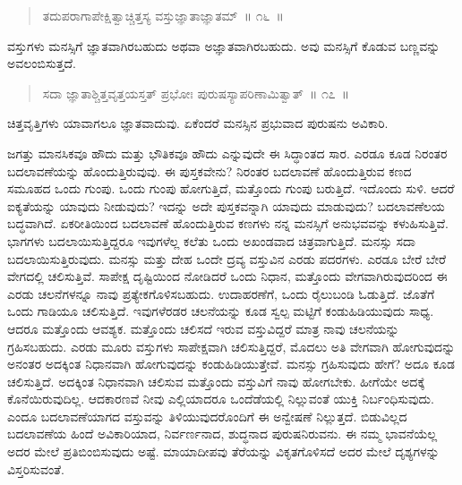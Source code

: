 \vspace{-0.3cm}

\begin{verse}
ತದುಪರಾಗಾಪೇಕ್ಷಿತ್ವಾಚ್ಚಿತ್ತಸ್ಯ ವಸ್ತುಜ್ಞಾತಾಜ್ಞಾತಮ್​~॥ ೧೬~॥
\end{verse}

\vspace{-0.3cm}

ವಸ್ತುಗಳು ಮನಸ್ಸಿಗೆ ಜ್ಞಾತವಾಗಿರಬಹುದು ಅಥವಾ ಅಜ್ಞಾತವಾಗಿರಬಹುದು. ಅವು ಮನಸ್ಸಿಗೆ ಕೊಡುವ ಬಣ್ಣವನ್ನು ಅವಲಂಬಿಸುತ್ತದೆ. 

\vspace{-0.3cm}

\begin{verse}
ಸದಾ ಜ್ಞಾತಾಶ್ಚಿತ್ತವೃತ್ತಯಸ್ತತ್​ ಪ್ರಭೋಃ ಪುರುಷಸ್ಯಾಪರಿಣಾಮಿತ್ವಾತ್​~॥ ೧೭~॥
\end{verse}

\vspace{-0.3cm}

ಚಿತ್ತವೃತ್ತಿಗಳು ಯಾವಾಗಲೂ ಜ್ಞಾತವಾದುವು. ಏಕೆಂದರೆ ಮನಸ್ಸಿನ ಪ್ರಭುವಾದ ಪುರುಷನು ಅವಿಕಾರಿ. 

ಜಗತ್ತು ಮಾನಸಿಕವೂ ಹೌದು ಮತ್ತು ಭೌತಿಕವೂ ಹೌದು ಎನ್ನುವುದೇ ಈ ಸಿದ್ಧಾಂತದ ಸಾರ. ಎರಡೂ ಕೂಡ ನಿರಂತರ ಬದಲಾವಣೆಯನ್ನು ಹೊಂದುತ್ತಿರುವುವು. ಈ ಪುಸ್ತಕವೇನು? ನಿರಂತರ ಬದಲಾವಣೆ ಹೊಂದುತ್ತಿರುವ ಕಣದ ಸಮೂಹದ ಒಂದು ಗುಂಪು. ಒಂದು ಗುಂಪು ಹೋಗುತ್ತಿದೆ, ಮತ್ತೊಂದು ಗುಂಪು ಬರುತ್ತಿದೆ. ಇದೊಂದು ಸುಳಿ. ಆದರೆ ಐಕ್ಯತೆಯನ್ನು ಯಾವುದು ನೀಡುವುದು? ಇದನ್ನು ಅದೇ ಪುಸ್ತಕವನ್ನಾಗಿ ಯಾವುದು ಮಾಡುವುದು? ಬದಲಾವಣೆಲಯ ಬದ್ಧವಾಗಿದೆ. ಏಕರೀತಿಯಿಂದ ಬದಲಾವಣೆ ಹೊಂದುತ್ತಿರುವ ಕಣಗಳು ನನ್ನ ಮನಸ್ಸಿಗೆ ಅನುಭವವನ್ನು ಕಳುಹಿಸುತ್ತಿವೆ. ಭಾಗಗಳು ಬದಲಾಯಿಸುತ್ತಿದ್ದರೂ ಇವುಗಳೆಲ್ಲ ಕಲೆತು ಒಂದು ಅಖಂಡವಾದ ಚಿತ್ರವಾಗುತ್ತಿದೆ. ಮನಸ್ಸು ಸದಾ ಬದಲಾಯಿಸುತ್ತಿರುವುದು. ಮನಸ್ಸು ಮತ್ತು ದೇಹ ಒಂದೇ ದ್ರವ್ಯ ವಸ್ತುವಿನ ಎರಡು ಪದರಗಳು. ಎರಡೂ ಬೇರೆ ಬೇರೆ ವೇಗದಲ್ಲಿ ಚಲಿಸುತ್ತಿವೆ. ಸಾಪೇಕ್ಷ ದೃಷ್ಟಿಯಿಂದ ನೋಡಿದರೆ ಒಂದು ನಿಧಾನ, ಮತ್ತೊಂದು ವೇಗವಾಗಿರುವುದರಿಂದ ಈ ಎರಡು ಚಲನೆಗಳನ್ನೂ ನಾವು ಪ್ರತ್ಯೇಕಗೊಳಿಸಬಹುದು. ಉದಾಹರಣೆಗೆ, ಒಂದು ರೈಲುಬಂಡಿ ಓಡುತ್ತಿದೆ. ಜೊತೆಗೆ ಒಂದು ಗಾಡಿಯೂ ಚಲಿಸುತ್ತಿದೆ. ಇವುಗಳೆರಡರ ಚಲನೆಯನ್ನು ಕೂಡ ಸ್ವಲ್ಪ ಮಟ್ಟಿಗೆ ಕಂಡುಹಿಡಿಯುವುದು ಸಾಧ್ಯ. ಆದರೂ ಮತ್ತೊಂದು ಆವಶ್ಯಕ. ಮತ್ತೊಂದು ಚಲಿಸದೆ ಇರುವ ವಸ್ತುವಿದ್ದರೆ ಮಾತ್ರ ನಾವು ಚಲನೆಯನ್ನು ಗ್ರಹಿಸಬಹುದು. ಎರಡು ಮೂರು ವಸ್ತುಗಳು ಸಾಪೇಕ್ಷವಾಗಿ ಚಲಿಸುತ್ತಿದ್ದರೆ, ಮೊದಲು ಅತಿ ವೇಗವಾಗಿ ಹೋಗುವುದನ್ನು ಅನಂತರ ಅದಕ್ಕಿಂತ ನಿಧಾನವಾಗಿ ಹೋಗುವುದನ್ನು ಕಂಡುಹಿಡಿಯುತ್ತೇವೆ. ಮನಸ್ಸು ಗ್ರಹಿಸುವುದು ಹೇಗೆ? ಅದೂ ಕೂಡ ಚಲಿಸುತ್ತಿದೆ. ಅದಕ್ಕಿಂತ ನಿಧಾನವಾಗಿ ಚಲಿಸುವ ಮತ್ತೊಂದು ವಸ್ತುವಿಗೆ ನಾವು ಹೋಗಬೇಕು. ಹೀಗೆಯೇ ಅದಕ್ಕೆ ಕೊನೆಯಿರುವುದಿಲ್ಲ. ಆದಕಾರಣವೆ ನೀವು ಎಲ್ಲಿಯಾದರೂ ಒಂದೆಡೆಯಲ್ಲಿ ನಿಲ್ಲುವಂತೆ ಯುಕ್ತಿ ನಿರ್ಬಂಧಿಸುವುದು. ಎಂದೂ ಬದಲಾವಣೆಯಾಗದ ವಸ್ತುವನ್ನು ತಿಳಿಯುವುದರೊಂದಿಗೆ ಈ ಅನ್ವೇಷಣೆ ನಿಲ್ಲುತ್ತದೆ. ಬಿಡುವಿಲ್ಲದ ಬದಲಾವಣೆಯ ಹಿಂದೆ ಅವಿಕಾರಿಯಾದ, ನಿರ್ವರ್ಣನಾದ, ಶುದ್ಧನಾದ ಪುರುಷನಿರುವನು. ಈ ನಮ್ಮ ಭಾವನೆಯೆಲ್ಲ ಅದರ ಮೇಲೆ ಪ್ರತಿಬಿಂಬಿಸುವುದು ಅಷ್ಟೆ. ಮಾಯಾದೀಪವು ತೆರೆಯನ್ನು ವಿಕೃತಗೊಳಿಸದೆ ಅದರ ಮೇಲೆ ದೃಶ್ಯಗಳನ್ನು ವಿಸ್ತರಿಸುವಂತೆ. 

